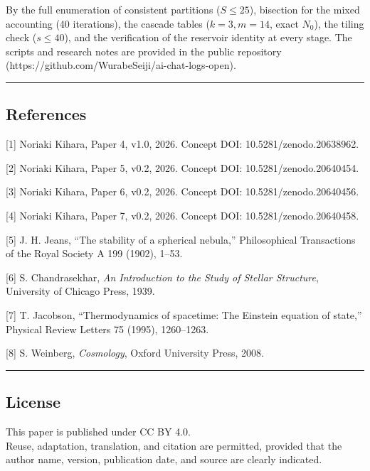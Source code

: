 \documentclass[
]{article}
\begin{document}
By the full enumeration of consistent partitions (\(S\le25\)), bisection
for the mixed accounting (40 iterations), the cascade tables
(\(k=3,m=14\), exact \(N_0\)), the tiling check (\(s\le40\)), and the
verification of the reservoir identity at every stage. The scripts and
research notes are provided in the public repository
(https://github.com/WurabeSeiji/ai-chat-logs-open).

\begin{center}\rule{0.5\linewidth}{0.5pt}\end{center}

\subsection{References}\label{references}

{[}1{]} Noriaki Kihara, Paper 4, v1.0, 2026. Concept DOI:
10.5281/zenodo.20638962.

{[}2{]} Noriaki Kihara, Paper 5, v0.2, 2026. Concept DOI: 10.5281/zenodo.20640454.

{[}3{]} Noriaki Kihara, Paper 6, v0.2, 2026. Concept DOI: 10.5281/zenodo.20640456.

{[}4{]} Noriaki Kihara, Paper 7, v0.2, 2026. Concept DOI: 10.5281/zenodo.20640458.

{[}5{]} J. H. Jeans, ``The stability of a spherical nebula,''
Philosophical Transactions of the Royal Society A 199 (1902), 1--53.

{[}6{]} S. Chandrasekhar, \emph{An Introduction to the Study of Stellar
Structure}, University of Chicago Press, 1939.

{[}7{]} T. Jacobson, ``Thermodynamics of spacetime: The Einstein
equation of state,'' Physical Review Letters 75 (1995), 1260--1263.

{[}8{]} S. Weinberg, \emph{Cosmology}, Oxford University Press, 2008.

\begin{center}\rule{0.5\linewidth}{0.5pt}\end{center}

\subsection{License}\label{license}

This paper is published under CC BY 4.0.\\
Reuse, adaptation, translation, and citation are permitted, provided
that the author name, version, publication date, and source are clearly
indicated.
\end{document}

